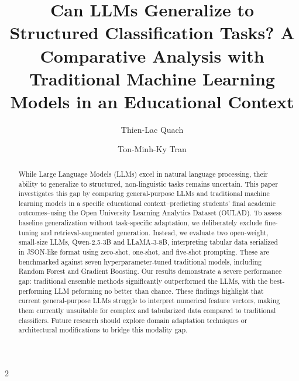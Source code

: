 \documentclass[runningheads, 10pt]{llncs}
\begin{document}
%
\title{Can LLMs Generalize to Structured Classification Tasks? A Comparative Analysis with Traditional Machine Learning Models in an Educational Context}
%
%
\author{Thien-Lac Quach\and
Ton-Minh-Ky Tran}
%
%
%
\maketitle              %
%
\begin{abstract}
While Large Language Models (LLMs) excel in natural language processing, their ability to generalize to structured, non-linguistic tasks remains uncertain. This paper investigates this gap by comparing general-purpose LLMs and traditional machine learning models in a specific educational context--predicting students' final academic outcomes--using the Open University Learning Analytics Dataset (OULAD). To assess baseline generalization without task-specific adaptation, we deliberately exclude fine-tuning and retrieval-augmented generation. Instead, we evaluate two open-weight, small-size LLMs, Qwen-2.5-3B and LLaMA-3-8B, interpreting tabular data serialized in JSON-like format using zero-shot, one-shot, and five-shot prompting. These are benchmarked against seven hyperparameter-tuned traditional models, including Random Forest and Gradient Boosting. Our results demonstrate a severe performance gap: traditional ensemble methods significantly outperformed the LLMs, with the best-performing LLM peforming no better than chance. These findings highlight that current general-purpose LLMs struggle to interpret numerical feature vectors, making them currently unsuitable for complex and tabularized data compared to traditional classifiers. Future research should explore domain adaptation techniques or architectural modifications to bridge this modality gap. 
\end{abstract}
%
%
\newpage

\begin{multicols}{2}
\sloppy
\raggedright








\end{multicols}


%
%

\printbibliography
\end{document}
